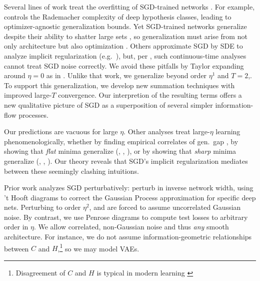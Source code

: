 \documentclass[final,12pt]{colt2021} %
\begin{document}
        
            Several lines of work treat the overfitting of SGD-trained networks
            \citep{ne17a}.  For example, \cite{ba17} controls the Rademacher
            complexity of deep hypothesis classes, leading to
            optimizer-agnostic generalization bounds.  Yet SGD-trained networks
            generalize despite their ability to shatter large sets
            \citep{zh17}, so generalization must arise from not only
            architecture but also optimization \citep{ne17b}.  Others
            approximate SGD by SDE to analyze implicit regularization (e.g.\
            \cite{ch18}), but, per \cite{ya19a}, such continuous-time analyses
            cannot treat SGD noise correctly.
            We avoid these pitfalls by Taylor expanding around $\eta=0$ as in
            \cite{ro18}.  Unlike that work, we generalize beyond order $\eta^1$
            and $T=2$,.  To support this generalization, we develop new 
            summation techniques with improved large-$T$ convergence.  Our
            interpretion of the resulting terms offers a new qualitative
            picture of SGD as a superposition of several simpler
            information-flow processes.
            
        
            Our predictions are vacuous for large $\eta$.  Other analyses treat
            large-$\eta$ learning phenomenologically, whether by finding
            empirical correlates of gen.\ gap \citep{li18}, by showing that
            \emph{flat} minima generalize (\cite{ho17}, \cite{ke17},
            \cite{wa18}), or by showing that \emph{sharp} minima generalize
            (\cite{st56}, \cite{di17}, \cite{wu18}).  Our theory reveals that 
            SGD's implicit regularization mediates between these seemingly
            clashing intuitions.
            
        
            Prior work analyzes SGD perturbatively: \cite{dy19} perturb in
            inverse network width, using 't Hooft diagrams to correct the
            Gaussian Process approximation for specific deep nets.  Perturbing
            to order $\eta^2$, \cite{ch18} and \cite{li17} are forced to assume
            uncorrelated Gaussian noise.  By contrast, we use Penrose diagrams
            to compute test losses to arbitrary order in $\eta$.  We allow
            correlated, non-Gaussian noise and thus \emph{any} smooth
            architecture.  For instance, we do not assume information-geometric
            relationships between $C$ and $H$,\footnote{
                Disagreement of $C$ and
                $H$ is typical in modern learning \citep{ro12, ku19}
            } so we may model VAEs. 
\end{document}

